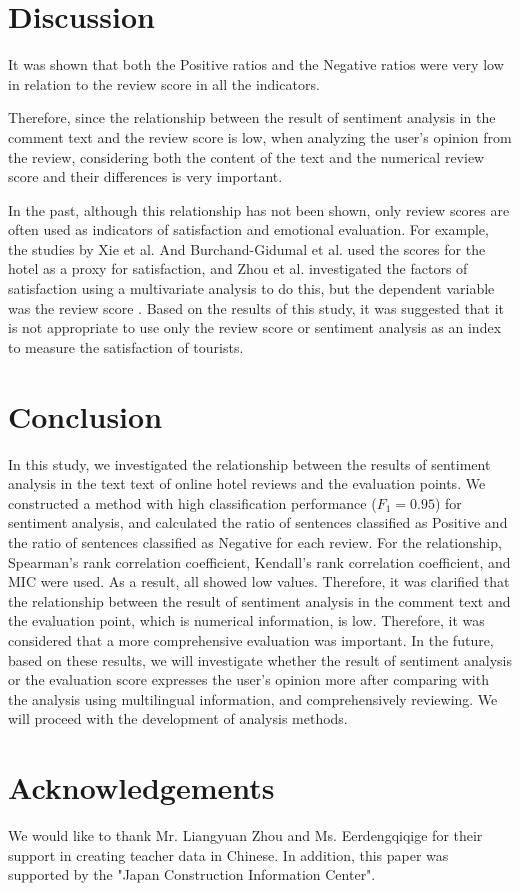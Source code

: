 \documentclass[review]{elsarticle}
\begin{document}
\section{Discussion}\label{discussion}

It was shown that both the Positive ratios and the Negative ratios were very low in relation to the review score in all the indicators.

Therefore, since the relationship between the result of sentiment analysis in the comment text and the review score is low, when analyzing the user's opinion from the review, considering both the content of the text and the numerical review score and their differences is very important.

In the past, although this relationship has not been shown, only review scores are often used as indicators of satisfaction and emotional evaluation. For example, the studies by Xie et al. And Burchand-Gidumal et al. used the scores for the hotel as a proxy for satisfaction\cite[][]{XIE20141, BULCHANDGIDUMAL201344}, and Zhou et al. investigated the factors of satisfaction using a multivariate analysis to do this, but the dependent variable was the review score \cite[][]{ZHOU20141}.
Based on the results of this study, it was suggested that it is not appropriate to use only the review score or sentiment analysis as an index to measure the satisfaction of tourists.

\section{Conclusion}\label{conclusion}

In this study, we investigated the relationship between the results of sentiment analysis in the text text of online hotel reviews and the evaluation points. We constructed a method with high classification performance (\(F_1 = 0.95\)) for sentiment analysis, and calculated the ratio of sentences classified as Positive and the ratio of sentences classified as Negative for each review. For the relationship, Spearman's rank correlation coefficient, Kendall's rank correlation coefficient, and MIC were used. As a result, all showed low values. Therefore, it was clarified that the relationship between the result of sentiment analysis in the comment text and the evaluation point, which is numerical information, is low. Therefore, it was considered that a more comprehensive evaluation was important. In the future, based on these results, we will investigate whether the result of sentiment analysis or the evaluation score expresses the user's opinion more after comparing with the analysis using multilingual information, and comprehensively reviewing. We will proceed with the development of analysis methods.

\section*{Acknowledgements}\label{acknowledgements}

We would like to thank Mr. Liangyuan Zhou and Ms. Eerdengqiqige for their support in creating teacher data in Chinese. In addition, this paper was supported by the "Japan Construction Information Center".

\clearpage


\end{document}
